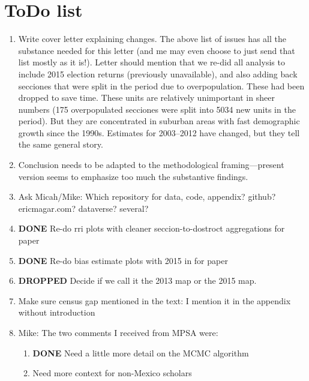 \documentclass{article}
\begin{document}
\section{ToDo list}
\label{sec:orgheadline42}
\begin{enumerate}
\item Write cover letter explaining changes. The above list of issues has all the substance needed for this letter (and me may even choose to just send that list mostly as it is!). Letter should mention that we re-did all analysis to include 2015 election returns (previously unavailable), and also adding back secciones that were split in the period due to overpopulation. These had been dropped to save time. These units are relatively unimportant in sheer numbers (175 overpopulated secciones were split into 5034 new units in the period). But they are concentrated in suburban areas with fast demographic growth since the 1990s. Estimates for 2003--2012 have changed, but they tell the same general story.
\label{sec:orgheadline32}
\item Conclusion needs to be adapted to the methodological framing---present version seems to emphasize too much the substantive findings.
\label{sec:orgheadline33}
\item Ask Micah/Mike: Which repository for data, code, appendix? github? ericmagar.com? dataverse? several?
\label{sec:orgheadline34}
\item {\bfseries\sffamily DONE} Re-do rri plots with cleaner seccion-to-dostroct aggregations for paper
\label{sec:orgheadline35}
\item {\bfseries\sffamily DONE} Re-do bias estimate plots with 2015 in for paper
\label{sec:orgheadline36}
\item {\bfseries\sffamily DROPPED} Decide if we call it the 2013 map or the 2015 map.
\label{sec:orgheadline37}
\item Make sure census gap mentioned in the text: I mention it in the appendix without introduction
\label{sec:orgheadline38}
\item Mike: The two comments I received from MPSA were:
\label{sec:orgheadline41}
\begin{enumerate}
\item {\bfseries\sffamily DONE} Need a little more detail on the MCMC algorithm
\label{sec:orgheadline39}
\item Need more context for non-Mexico scholars
\label{sec:orgheadline40}
\end{enumerate}
\end{enumerate}
\end{document}
